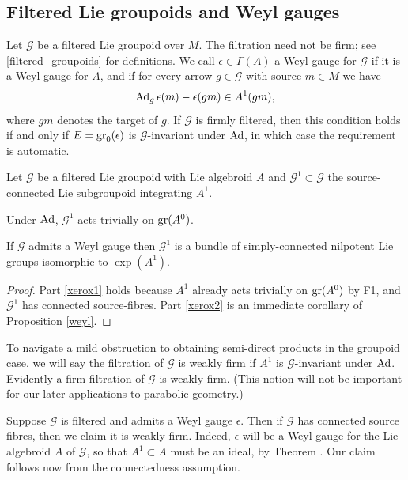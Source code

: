 \documentclass[leqno,12pt]{amsart} %
\begin{document}
\subsection{Filtered Lie groupoids and Weyl gauges}\label{weyl2}
Let ${\mathcal G} $ be a filtered Lie groupoid over $M$. The filtration need not be firm;
see \ref{filtered_groupoids} for definitions. We call $\epsilon  \in \Gamma(A)$ a {\df Weyl gauge}
for ${\mathcal G} $ if it is a Weyl gauge for $A$, and if for every arrow
$g \in {\mathcal G}$ with source $m \in M$ we have
\begin{equation}\label{tui}
   \operatorname{Ad}_g \epsilon(m) - \epsilon(gm) \in A^1(gm),
\end{equation}
where $gm$ denotes the target of $g$. If ${\mathcal G} $ is firmly filtered, then this
condition holds if and only if $E= \operatorname{\operatorname{gr}}_0(\epsilon)$ is ${\mathcal G}$-invariant under
$\operatorname{Ad}$, in which case the requirement  is automatic.

\begin{proposition}
  Let ${\mathcal G} $ be a filtered Lie groupoid with Lie algebroid $A$ and
  ${\mathcal G}^1 \subset {\mathcal G} $ the source-connected Lie subgroupoid integrating
  $A^1$.
  \begin{conditions}
    \item Under $\operatorname{Ad}$, ${\mathcal G}^1$ acts trivially on $\operatorname{\operatorname{gr}}(A^0)$.\label{xerox1}
    \item If ${\mathcal G} $ admits a Weyl gauge then ${\mathcal G}^1$ is a bundle of
      simply-connected nilpotent Lie groups isomorphic to $\exp(A^1)$.\label{xerox2}
  \end{conditions}
\end{proposition}
\begin{proof}
  Part \eqref{xerox1} holds because $A^1$ already acts trivially on $\operatorname{\operatorname{gr}}(A^0)$ by F1,
  and ${\mathcal G}^1$ has connected source-fibres. Part \eqref{xerox2} is an immediate
  corollary of Proposition \ref{weyl}.
\end{proof}

To navigate a mild obstruction to obtaining semi-direct products in the groupoid
case, we will say the filtration of $\mathcal G$ is {\df weakly firm} if $A^1$ is
${\mathcal G} $-invariant under $\operatorname{Ad}$. Evidently a firm filtration of
${\mathcal G} $ is weakly firm. (This notion will not be important for our later applications to parabolic geometry.)
\begin{remark}
  Suppose ${\mathcal G} $ is filtered and admits a Weyl gauge $\epsilon$. Then if $\mathcal G$ has
  connected source fibres, then we claim it is weakly firm. Indeed, $\epsilon$ will be a
  Weyl gauge for the Lie algebroid $A$ of ${\mathcal G} $, so that $A^1 \subset A$ must be an ideal, by
  Theorem . Our claim follows now from the connectedness assumption.
\end{remark}
\end{document}
